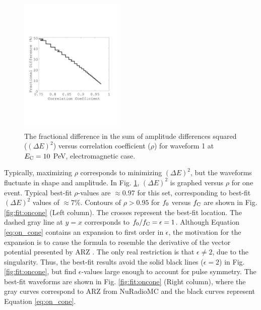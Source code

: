 \documentclass[amsmath,amssymb,aps,prd,10pt,twocolumn]{revtex4}
\begin{document}
\begin{figure}
\centering
\includegraphics[width=0.45\textwidth,trim=0cm 6cm 0cm 6cm,clip=true]{f_vs_rho.pdf}
\caption{\label{fig:f_vs_rho}  The fractional difference in the sum of amplitude differences squared ($(\Delta E)^2$) versus correlation coefficient ($\rho$) for waveform 1 at $E_{\rm C} = 10$ PeV, electromagnetic case.}
\end{figure}

Typically, maximizing $\rho$ corresponds to minimizing $(\Delta E)^2$, but the waveforms fluctuate in shape and amplitude.  In Fig. \ref{fig:f_vs_rho}, $(\Delta E)^2$ is graphed versus $\rho$ for one event.  Typical best-fit $\rho$-values are $\approx 0.97$ for this set, corresponding to best-fit $(\Delta E)^2$ values of $\approx 7\%$.  Contours of $\rho>0.95$ for $f_{\rm 0}$ versus $f_{\rm C}$ are shown in Fig. \ref{fig:fit:oncone} (Left column). The crosses represent the best-fit location.  The dashed gray line at $y=x$ corresponds to $f_{\rm 0}/f_{\rm C} = \epsilon = 1$.  Although Equation \ref{eq:on_cone} contains an expansion to first order in $\epsilon$, the motivation for the expansion is to cause the formula to resemble the derivative of the vector potential presented by ARZ \cite{PhysRevD.101.083005}.  The only real restriction is that $\epsilon \neq 2$, due to the singularity.  Thus, the best-fit results avoid the solid black lines ($\epsilon = 2$) in Fig. \ref{fig:fit:oncone}, but find $\epsilon$-values large enough to account for pulse symmetry.  The best-fit waveforms are shown in Fig. \ref{fig:fit:oncone} (Right column), where the gray curves correspond to ARZ from NuRadioMC and the black curves represent Equation \ref{eq:on_cone}.
\end{document}
